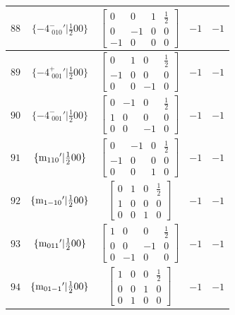 \documentclass[fleqn,8pt]{jsarticle}
\begin{document}
\begin{longtable}{ccccc}
$ 88 $ & $ \{-4^{-}_{\,\,010}{}'|\frac{1}{2} 0 0\} $ & $ \begin{bmatrix} 0 & 0 & 1 & \frac{1}{2} \\ 0 & -1 & 0 & 0 \\ -1 & 0 & 0 & 0 \end{bmatrix} $ & $ -1 $ & $ -1 $ \\ \hline
$ 89 $ & $ \{-4^{+}_{\,\,001}{}'|\frac{1}{2} 0 0\} $ & $ \begin{bmatrix} 0 & 1 & 0 & \frac{1}{2} \\ -1 & 0 & 0 & 0 \\ 0 & 0 & -1 & 0 \end{bmatrix} $ & $ -1 $ & $ -1 $ \\ \hline
$ 90 $ & $ \{-4^{-}_{\,\,001}{}'|\frac{1}{2} 0 0\} $ & $ \begin{bmatrix} 0 & -1 & 0 & \frac{1}{2} \\ 1 & 0 & 0 & 0 \\ 0 & 0 & -1 & 0 \end{bmatrix} $ & $ -1 $ & $ -1 $ \\ \hline
$ 91 $ & $ \{{\rm m}_{110}{}'|\frac{1}{2} 0 0\} $ & $ \begin{bmatrix} 0 & -1 & 0 & \frac{1}{2} \\ -1 & 0 & 0 & 0 \\ 0 & 0 & 1 & 0 \end{bmatrix} $ & $ -1 $ & $ -1 $ \\ \hline
$ 92 $ & $ \{{\rm m}_{1-10}{}'|\frac{1}{2} 0 0\} $ & $ \begin{bmatrix} 0 & 1 & 0 & \frac{1}{2} \\ 1 & 0 & 0 & 0 \\ 0 & 0 & 1 & 0 \end{bmatrix} $ & $ -1 $ & $ -1 $ \\ \hline
$ 93 $ & $ \{{\rm m}_{011}{}'|\frac{1}{2} 0 0\} $ & $ \begin{bmatrix} 1 & 0 & 0 & \frac{1}{2} \\ 0 & 0 & -1 & 0 \\ 0 & -1 & 0 & 0 \end{bmatrix} $ & $ -1 $ & $ -1 $ \\ \hline
$ 94 $ & $ \{{\rm m}_{01-1}{}'|\frac{1}{2} 0 0\} $ & $ \begin{bmatrix} 1 & 0 & 0 & \frac{1}{2} \\ 0 & 0 & 1 & 0 \\ 0 & 1 & 0 & 0 \end{bmatrix} $ & $ -1 $ & $ -1 $ \\ \hline

\end{longtable}
\end{document}
